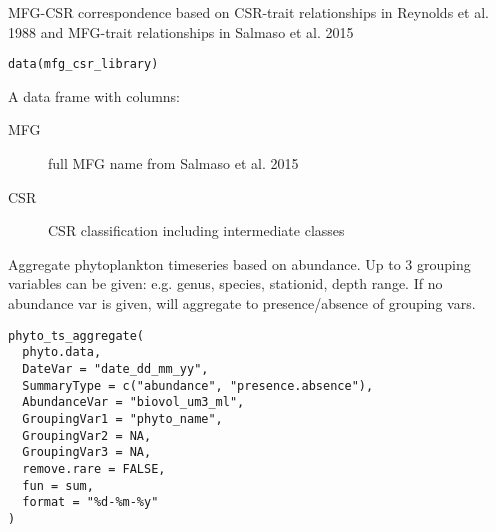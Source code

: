 \documentclass[a4paper]{book}
\begin{document}
%
\begin{Description}\relax
MFG-CSR correspondence based on CSR-trait relationships in Reynolds et al. 1988
and MFG-trait relationships in Salmaso et al. 2015
\end{Description}
%
\begin{Usage}
\begin{verbatim}
data(mfg_csr_library)
\end{verbatim}
\end{Usage}
%
\begin{Format}
A data frame with columns:
\begin{description}

\item[MFG] full MFG name from Salmaso et al. 2015
\item[CSR] CSR classification including intermediate classes

\end{description}

\end{Format}
%
\begin{Description}\relax
Aggregate phytoplankton timeseries based on abundance. Up to 3 grouping variables can be given:
e.g. genus, species, stationid, depth range.
If no abundance var is given, will aggregate to presence/absence of grouping vars.
\end{Description}
%
\begin{Usage}
\begin{verbatim}
phyto_ts_aggregate(
  phyto.data,
  DateVar = "date_dd_mm_yy",
  SummaryType = c("abundance", "presence.absence"),
  AbundanceVar = "biovol_um3_ml",
  GroupingVar1 = "phyto_name",
  GroupingVar2 = NA,
  GroupingVar3 = NA,
  remove.rare = FALSE,
  fun = sum,
  format = "%d-%m-%y"
)
\end{verbatim}
\end{Usage}
%
\end{document}
